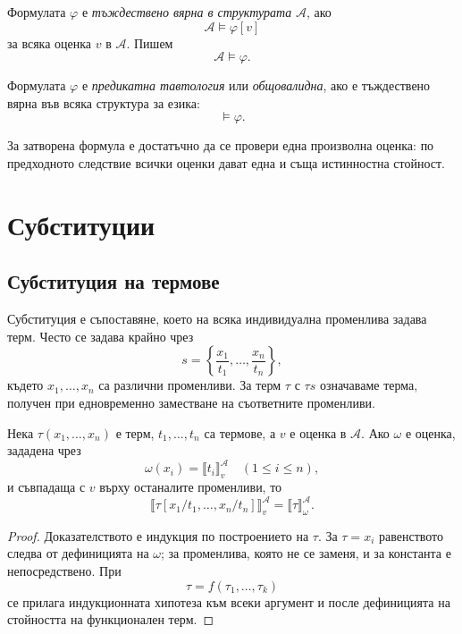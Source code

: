 \begin{defn}
Формулата $\varphi$ е \emph{тъждествено вярна в структурата} $\mathcal A$, ако
\[
\mathcal A\models\varphi[v]
\]
за всяка оценка $v$ в $\mathcal A$. Пишем
\[
\mathcal A\models\varphi.
\]
\end{defn}

\begin{defn}
Формулата $\varphi$ е \emph{предикатна тавтология} или \emph{общовалидна}, ако е тъждествено вярна във всяка структура за езика:
\[
\models\varphi.
\]
\end{defn}

\begin{remark}
За затворена формула е достатъчно да се провери една произволна оценка: по предходното следствие всички оценки дават една и съща истинностна стойност.
\end{remark}

\section{Субституции}\label{s:21.4}

\subsection{Субституция на термове}\label{s:21.4.1}

\begin{defn}
Субституция е съпоставяне, което на всяка индивидуална променлива задава терм. Често се задава крайно чрез
\[
s=\left\{\frac{x_1}{t_1},\ldots,\frac{x_n}{t_n}\right\},
\]
където $x_1,\ldots,x_n$ са различни променливи. За терм $\tau$ с $\tau s$ означаваме терма, получен при едновременно заместване на съответните променливи.
\end{defn}

\begin{lem}
Нека $\tau(x_1,\ldots,x_n)$ е терм, $t_1,\ldots,t_n$ са термове, а $v$ е оценка в $\mathcal A$. Ако $\omega$ е оценка, зададена чрез
\[
\omega(x_i)=\llbracket t_i\rrbracket^{\mathcal A}_v
\quad (1\leq i\leq n),
\]
и съвпадаща с $v$ върху останалите променливи, то
\[
\llbracket\tau[x_1/t_1,\ldots,x_n/t_n]\rrbracket^{\mathcal A}_v
=
\llbracket\tau\rrbracket^{\mathcal A}_\omega.
\]
\end{lem}

\begin{proof}
Доказателството е индукция по построението на $\tau$. За $\tau=x_i$ равенството следва от дефиницията на $\omega$; за променлива, която не се заменя, и за константа е непосредствено. При
\[
\tau=f(\tau_1,\ldots,\tau_k)
\]
се прилага индукционната хипотеза към всеки аргумент и после дефиницията на стойността на функционален терм.
\end{proof}

